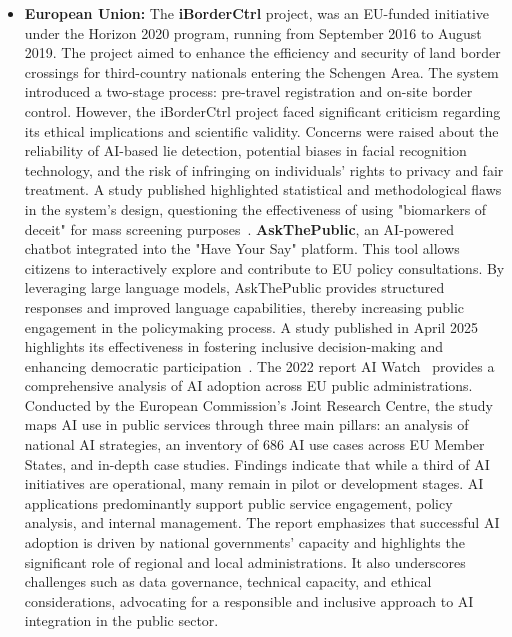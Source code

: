 \documentclass[12pt]{report}
\begin{document}
\begin{itemize}
    \item \textbf{European Union:} The \textbf{iBorderCtrl} project,  was an EU-funded initiative under the Horizon 2020 program, running from September 2016 to August 2019. The project aimed to enhance the efficiency and security of land border crossings for third-country nationals entering the Schengen Area. The system introduced a two-stage process: pre-travel registration and on-site border control. However, the iBorderCtrl project faced significant criticism regarding its ethical implications and scientific validity. Concerns were raised about the reliability of AI-based lie detection, potential biases in facial recognition technology, and the risk of infringing on individuals' rights to privacy and fair treatment. A study published highlighted statistical and methodological flaws in the system's design, questioning the effectiveness of using "biomarkers of deceit" for mass screening purposes~\cite{sánchezmonedero2020politicsdeceptivebordersbiomarkers}. 
    \textbf{AskThePublic}, an AI-powered chatbot integrated into the "Have Your Say" platform. This tool allows citizens to interactively explore and contribute to EU policy consultations. By leveraging large language models, AskThePublic provides structured responses and improved language capabilities, thereby increasing public engagement in the policymaking process. A study published in April 2025 highlights its effectiveness in fostering inclusive decision-making and enhancing democratic participation~\cite{sprenkamp2025effectiveeueparticipationdevelopment}.
    The 2022 report AI Watch~\cite{doi/10.2760/39336} provides a comprehensive analysis of AI adoption across EU public administrations. Conducted by the European Commission's Joint Research Centre, the study maps AI use in public services through three main pillars: an analysis of national AI strategies, an inventory of 686 AI use cases across EU Member States, and in-depth case studies. Findings indicate that while a third of AI initiatives are operational, many remain in pilot or development stages. AI applications predominantly support public service engagement, policy analysis, and internal management. The report emphasizes that successful AI adoption is driven by national governments' capacity and highlights the significant role of regional and local administrations. It also underscores challenges such as data governance, technical capacity, and ethical considerations, advocating for a responsible and inclusive approach to AI integration in the public sector.

\end{itemize}
\end{document}

